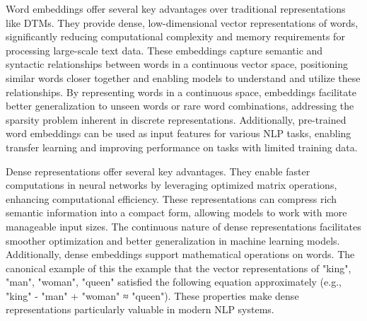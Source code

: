 \documentclass[a4paper, oneside]{discothesis}
\begin{document}
Word embeddings offer several key advantages over traditional representations like DTMs. They provide dense, low-dimensional vector representations of words, significantly reducing 
computational complexity and memory requirements for processing large-scale text data. These embeddings capture semantic and syntactic relationships between words in a continuous 
vector space, positioning similar words closer together and enabling models to understand and utilize these relationships. By representing words in a continuous space, embeddings 
facilitate better generalization to unseen words or rare word combinations, addressing the sparsity problem inherent in discrete representations. Additionally, pre-trained word 
embeddings can be used as input features for various NLP tasks, enabling transfer learning and improving performance on tasks with limited training data.

Dense representations offer several key advantages. They enable faster computations in neural networks by leveraging optimized matrix operations, enhancing computational efficiency. 
These representations can compress rich semantic information into a compact form, allowing models to work with more manageable input sizes. The continuous nature of dense representations 
facilitates smoother optimization and better generalization in machine learning models. Additionally, dense embeddings support mathematical operations on words. The canonical example of this 
the example that the vector representations of "king", "man", "woman", "queen" satisfied the following equation approximately (e.g., "king" - "man" + "woman" ≈ "queen"). 
These properties make dense representations particularly valuable in modern NLP systems.

\end{document}
